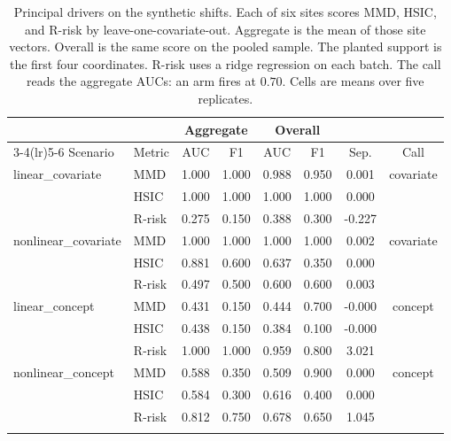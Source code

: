 \begin{table}[t]
\centering
\caption{Principal drivers on the synthetic shifts. Each of six sites scores MMD, HSIC, and R-risk by leave-one-covariate-out. Aggregate is the mean of those site vectors. Overall is the same score on the pooled sample. The planted support is the first four coordinates. R-risk uses a ridge regression on each batch. The call reads the aggregate AUCs: an arm fires at $0.70$. Cells are means over five replicates.}
\label{tab:synth-site-drivers}
\begin{tabular}{llcccccc}
\toprule
& & \multicolumn{2}{c}{Aggregate} & \multicolumn{2}{c}{Overall} & & \\
\cmidrule(lr){3-4}\cmidrule(lr){5-6}
Scenario & Metric & AUC & F1 & AUC & F1 & Sep. & Call \\
\midrule
linear\_covariate & MMD & 1.000 & 1.000 & 0.988 & 0.950 & 0.001 & covariate \\
 & HSIC & 1.000 & 1.000 & 1.000 & 1.000 & 0.000 &  \\
 & R-risk & 0.275 & 0.150 & 0.388 & 0.300 & -0.227 &  \\
\addlinespace
nonlinear\_covariate & MMD & 1.000 & 1.000 & 1.000 & 1.000 & 0.002 & covariate \\
 & HSIC & 0.881 & 0.600 & 0.637 & 0.350 & 0.000 &  \\
 & R-risk & 0.497 & 0.500 & 0.600 & 0.600 & 0.003 &  \\
\addlinespace
linear\_concept & MMD & 0.431 & 0.150 & 0.444 & 0.700 & -0.000 & concept \\
 & HSIC & 0.438 & 0.150 & 0.384 & 0.100 & -0.000 &  \\
 & R-risk & 1.000 & 1.000 & 0.959 & 0.800 & 3.021 &  \\
\addlinespace
nonlinear\_concept & MMD & 0.588 & 0.350 & 0.509 & 0.900 & 0.000 & concept \\
 & HSIC & 0.584 & 0.300 & 0.616 & 0.400 & 0.000 &  \\
 & R-risk & 0.812 & 0.750 & 0.678 & 0.650 & 1.045 &  \\
\addlinespace
\bottomrule
\end{tabular}
\end{table}
